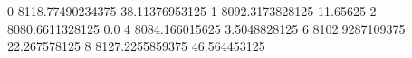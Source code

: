 0 8118.77490234375 38.11376953125
1 8092.3173828125 11.65625
2 8080.6611328125 0.0
4 8084.166015625 3.5048828125
6 8102.9287109375 22.267578125
8 8127.2255859375 46.564453125
